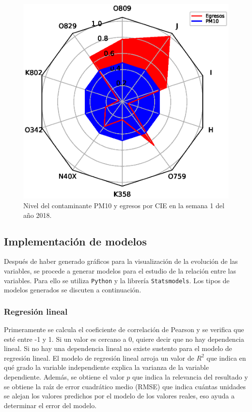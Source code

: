 \begin{figure}[h!]
\setcounter{figure}{0} %
\captionsetup{type=figure} %
\begin{center}
   \includegraphics[trim=0 0 0 38,clip,width=1\textwidth]{spiderweb_PM10_2018_1.eps}
   \end{center}
    \caption[Ejemplo de gráfico de radar]{Nivel del contaminante PM10 y egresos por CIE en la semana 1 del año 2018.}
    \label{grafico_de_telaraña}
\end{figure}

\clearpage
\subsection{Implementación de modelos}
Después de haber generado gráficos para la visualización de la evolución de las variables, se procede a generar modelos para el estudio de la relación entre las variables. Para ello se utiliza \texttt{Python} y la librería \texttt{Statsmodels}. Los tipos de modelos generados se discuten a continuación.

\subsubsection{Regresión lineal}
Primeramente se calcula el coeficiente de correlación de Pearson y se verifica que esté entre -1 y 1. Si un valor es cercano a 0, quiere decir que no hay dependencia lineal. Si no hay una dependencia lineal no existe sustento para el modelo de regresión lineal. El modelo de regresión lineal arroja un valor de $R^2$ que indica en qué grado la variable independiente explica la varianza de la variable dependiente. Además, se obtiene el valor $p$ que indica la relevancia del resultado y se obtiene la raíz de error cuadrático medio (RMSE) que indica cuántas unidades se alejan los valores predichos por el modelo de los valores reales, eso ayuda a determinar el error del modelo.

